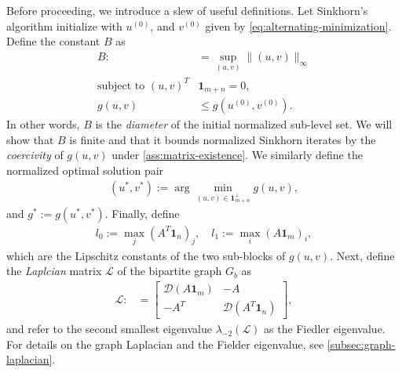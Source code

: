 Before proceeding, we introduce a slew of useful definitions. Let Sinkhorn's algorithm initialize with $u^{(0)}$, and $v^{(0)}$ given by \eqref{eq:alternating-minimization}. 
Define the constant $B$ as 
\begin{align*}
   B:&= \sup_{(u,v)} \|(u,v)\|_\infty\\  \text{subject to } (u,v)^{T}&\mathbf{1}_{m+n}=0,\\
   g(u,v)&\leq g(u^{(0)},v^{(0)}).
\end{align*}
In other words, $B$ is the \emph{diameter} of the initial normalized sub-level set. We will show that $B$ is finite and that it bounds normalized Sinkhorn iterates by the \emph{coercivity} of $g(u,v)$ under \cref{ass:matrix-existence}.  
We similarly define the normalized optimal solution pair 
\begin{align}
\label{eq:normalized-optimum}
    (u^\ast,v^\ast):=\arg \min_{(u,v)\in \mathbf{1}_{m+n}^\perp} g(u,v),
\end{align}
and $g^\ast:=g(u^\ast,v^\ast)$.
Finally, define 
\begin{align*}
    l_0:= \max_j (A^T\mathbf{1}_n)_j, \quad l_1:= \max_i (A\mathbf{1}_m)_i,
\end{align*}
which are the Lipschitz constants of the two sub-blocks of $g(u,v)$. Next, define the \emph{Laplcian} matrix $\mathcal{L}$ of the bipartite graph $G_b$ as 
\begin{align*}
\mathcal{L}:&=\begin{bmatrix}\mathcal{D}({A}\mathbf{1}_{m}) & -{A}\\
-{A}^{T} & \mathcal{D}({A}^{T}\mathbf{1}_{n})
\end{bmatrix}, 
\end{align*}
and refer to the second smallest eigenvalue $\lambda_{-2}(\mathcal{L})$ as the Fiedler eigenvalue. For details on the graph Laplacian and the Fielder eigenvalue, see \cref{subsec:graph-laplacian}.

